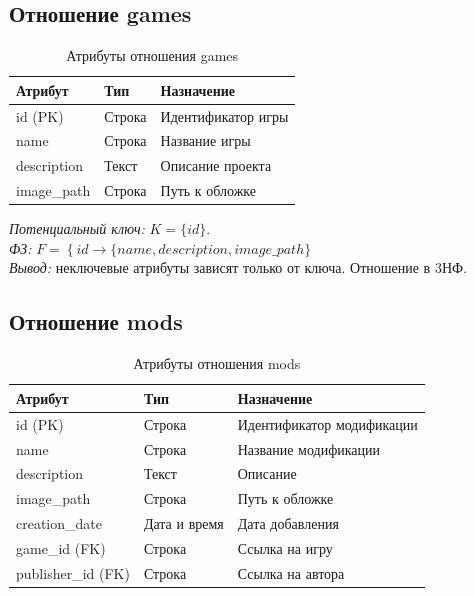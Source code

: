 \subsection*{Отношение games}

\begin{table}[H]
	\centering
	\caption{Атрибуты отношения games}
	\label{tab:games}
	\begin{tabularx}{\textwidth}{|l|X|X|}
		\hline
		\textbf{Атрибут} & \textbf{Тип} & \textbf{Назначение} \\
		\hline
		id (PK) & Строка & Идентификатор игры \\
		\hline
		name & Строка & Название игры \\
		\hline
		description & Текст & Описание проекта \\
		\hline
		image\_path & Строка & Путь к обложке \\
		\hline
	\end{tabularx}
\end{table}

\textit{Потенциальный ключ:} $K = \{id\}$. \\
\textit{ФЗ:} $F = \left\{ id \rightarrow \{name, description, image\_path\} \right.$ \\
\textit{Вывод:} неключевые атрибуты зависят только от ключа. Отношение в 3НФ.

\subsection*{Отношение mods}

\begin{table}[H]
	\centering
	\caption{Атрибуты отношения mods}
	\label{tab:mods}
	\begin{tabularx}{\textwidth}{|l|l|X|}
		\hline
		\textbf{Атрибут} & \textbf{Тип} & \textbf{Назначение} \\
		\hline
		id (PK) & Строка & Идентификатор модификации \\
		\hline
		name & Строка & Название модификации \\
		\hline
		description & Текст & Описание \\
		\hline
		image\_path & Строка & Путь к обложке \\
		\hline
		creation\_date & Дата и время & Дата добавления \\
		\hline
		game\_id (FK) & Строка & Ссылка на игру \\
		\hline
		publisher\_id (FK)& Строка & Ссылка на автора \\
		\hline
	\end{tabularx}
\end{table}

